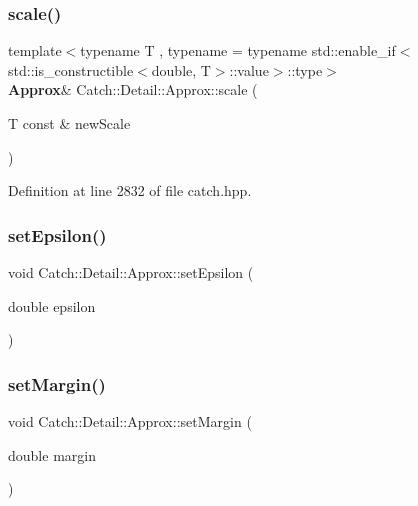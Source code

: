 \mbox{\label{class_catch_1_1_detail_1_1_approx_a8f4d2def2920a3840d3271f6d9c5ede2}} 
\subsubsection{scale()}
{\footnotesize\ttfamily template$<$typename T , typename  = typename std\+::enable\+\_\+if$<$std\+::is\+\_\+constructible$<$double, T$>$\+::value$>$\+::type$>$ \\
\textbf{ Approx}\& Catch\+::\+Detail\+::\+Approx\+::scale (\begin{DoxyParamCaption}\item[{T const \&}]{new\+Scale }\end{DoxyParamCaption})\hspace{0.3cm}{\ttfamily [inline]}}



Definition at line 2832 of file catch.\+hpp.

\mbox{\label{class_catch_1_1_detail_1_1_approx_a28fd65e069b698bc7ae8f060bfbcd6b6}} 
\subsubsection{setEpsilon()}
{\footnotesize\ttfamily void Catch\+::\+Detail\+::\+Approx\+::set\+Epsilon (\begin{DoxyParamCaption}\item[{double}]{epsilon }\end{DoxyParamCaption})\hspace{0.3cm}{\ttfamily [private]}}

\mbox{\label{class_catch_1_1_detail_1_1_approx_aff04b8b32edc707138eb395ed45ec576}} 
\subsubsection{setMargin()}
{\footnotesize\ttfamily void Catch\+::\+Detail\+::\+Approx\+::set\+Margin (\begin{DoxyParamCaption}\item[{double}]{margin }\end{DoxyParamCaption})\hspace{0.3cm}{\ttfamily [private]}}

